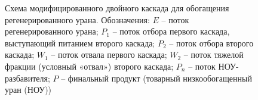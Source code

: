 \begin{figure}[ht]
    \caption{Схема модифицированного двойного каскада для обогащения регенерированного урана. Обозначения: $E$ -- поток регенерированного урана; $P_1$ -- поток отбора первого каскада, выступающий питанием второго каскада; $P_2$ -- поток отбора второго каскада; $W_1$ -- поток отвала первого каскада; $W_2$ -- поток тяжелой фракции (условный «отвал») второго каскада; $P_n$ -- поток НОУ-разбавителя; $P$ -- финальный продукт (товарный низкообогащенный уран (НОУ))}\label{p2left}
\end{figure}

